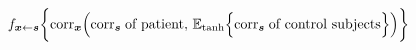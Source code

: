 \documentclass[10pt]{article}
\begin{document}
\[f_{\vb*{x} \leftarrow \vb*{s}} \qty\bigg{
    \text{corr}_{\vb*{x}} \qty( \text{corr}_{\vb*{s}} \; \text{of patient}, \, \mathbb{E}_{\text{tanh}} \qty\Big{
         \text{corr}_{\vb*{s}} \; \text{of control subjects} } ) }\]
\end{document}
